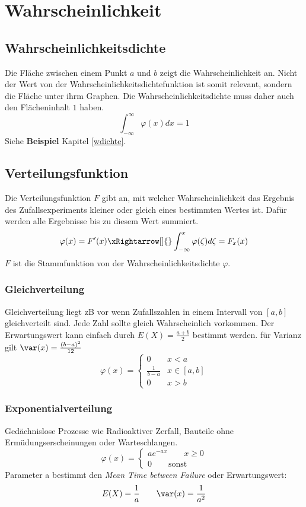 \section{Wahrscheinlichkeit}
\subsection{Wahrscheinlichkeitsdichte}
Die Fläche zwischen einem Punkt $a$ und $b$ zeigt die Wahrscheinlichkeit an. Nicht der Wert von der Wahrscheinlichkeitsdichtefunktion ist somit relevant, sondern die Fläche unter ihrm Graphen. Die Wahrscheinlichkeitsdichte muss daher auch den Flächeninhalt $1$ haben. 
\[
\int_{-\infty}^{\infty}\varphi(x)dx = 1
\]
Siehe \textbf{Beispiel} Kapitel \ref{wdichte}.

\subsection{Verteilungsfunktion}
Die Verteilungsfunktion $F$ gibt an, mit welcher Wahrscheinlichkeit das Ergebnis des Zufallsexperiments kleiner oder gleich eines bestimmten Wertes ist. Dafür werden alle Ergebnisse bis zu diesem Wert summiert. 
\[
\varphi(x) = F'(x) \xRightarrow[]{} \int_{-\infty}^{x}\varphi(\zeta)d\zeta = F_x(x)
\]
$F$ ist die Stammfunktion von der Wahrscheinlichkeitsdichte $\varphi$.

\subsubsection{Gleichverteilung}
Gleichverteilung liegt zB vor wenn Zufallszahlen  in einem Intervall von $[a, b]$ gleichverteilt sind. Jede Zahl sollte gleich Wahrscheinlich vorkommen. Der Erwartungswert kann einfach durch $E(X) = \frac{a + b}{2}$ bestimmt werden. für Varianz gilt $\var(x) = \frac{(b-a)^2}{12}$
\[
\varphi(x) = \begin{cases}
	0 & x < a \\
	\frac{1}{b-a} & x \in [a,b] \\
	0 & x > b
\end{cases}
\]

\subsubsection{Exponentialverteilung}
Gedächnislose Prozesse wie Radioaktiver Zerfall, Bauteile ohne Ermüdungserscheinungen oder Warteschlangen.
\[\varphi(x) = \begin{cases*}
	ae^{-ax} \qquad x \geq 0 \\
	0 \qquad \text{sonst}
\end{cases*}\]
Parameter a bestimmt den \textit{Mean Time between Failure} oder Erwartungswert: 
\[E(X) = \frac{1}{a} \qquad \var(x) = \frac{1}{a^2}\]

